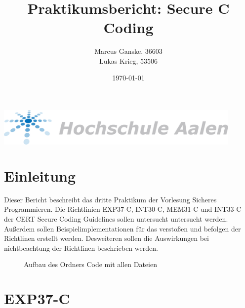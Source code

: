 \documentclass[12pt]{article}
\title{Praktikumsbericht: Secure C Coding}
\author{Marcus Ganske, 36603\\
		Lukas Krieg, 53506}
\date{\today}
\begin{document}
\maketitle
\vspace{+8cm}{
}
\includegraphics[width=12cm]{Hochschule-aalen.pdf}

\newpage
\renewcommand\contentsname{Inhaltsverzeichnis}
\tableofcontents
\newpage

	
	\section{Einleitung}
    Dieser Bericht beschreibt das dritte Praktikum der Vorlesung Sicheres Programmieren. Die Richtlinien EXP37-C, INT30-C, MEM31-C und INT33-C der CERT Secure Coding Guidelines sollen untersucht untersucht werden. Außerdem sollen Beispielimplementationen für das verstoßen und befolgen der Richtlinen erstellt werden. Desweiteren sollen die Auswirkungen bei nichtbeachtung der Richtlinen beschrieben werden.
	\begin{figure}[H]
	
		\caption{Aufbau des Ordners Code mit allen Dateien}
	\end{figure}	


\section{EXP37-C}
\end{document}
